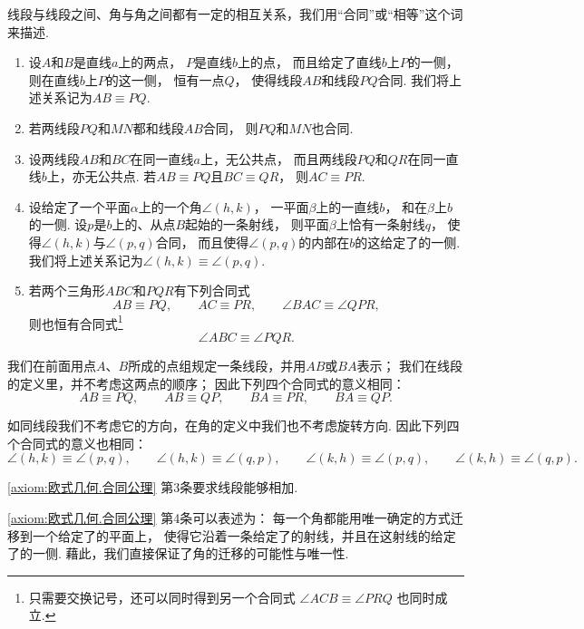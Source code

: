 \begin{axiom}[合同公理]\label{axiom:欧式几何.合同公理}
线段与线段之间、角与角之间都有一定的相互关系，我们用“合同”或“相等”这个词来描述.
\begin{enumerate}
\item 设\(A\)和\(B\)是直线\(a\)上的两点，%
\(P\)是直线\(b\)上的点，%
而且给定了直线\(b\)上\(P\)的一侧，%
则在直线\(b\)上\(P\)的这一侧，%
恒有一点\(Q\)，%
使得线段\(AB\)和线段\(PQ\)合同.
我们将上述关系记为\(AB \equiv PQ\).

\item 若两线段\(PQ\)和\(MN\)都和线段\(AB\)合同，%
则\(PQ\)和\(MN\)也合同.

\item 设两线段\(AB\)和\(BC\)在同一直线\(a\)上，无公共点，%
而且两线段\(PQ\)和\(QR\)在同一直线\(b\)上，亦无公共点.
若\(AB \equiv PQ\)且\(BC \equiv QR\)，%
则\(AC \equiv PR\).

\item 设给定了一个平面\(\alpha\)上的一个角\(\angle(h,k)\)，%
一平面\(\beta\)上的一直线\(b\)，%
和在\(\beta\)上\(b\)的一侧.
设\(p\)是\(b\)上的、从点\(B\)起始的一条射线，%
则平面\(\beta\)上恰有一条射线\(q\)，%
使得\(\angle(h,k)\)与\(\angle(p,q)\)合同，%
而且使得\(\angle(p,q)\)的内部在\(b\)的这给定了的一侧.
我们将上述关系记为\(\angle(h,k) \equiv \angle(p,q)\).

\item 若两个三角形\(ABC\)和\(PQR\)有下列合同式
\[
AB \equiv PQ, \qquad
AC \equiv PR, \qquad
\angle BAC \equiv \angle QPR,
\]
则也恒有合同式\footnote{%
只需要交换记号，还可以同时得到另一个合同式
\(\angle ACB \equiv \angle PRQ\)
也同时成立.
}
\[
\angle ABC \equiv \angle PQR.
\]
\end{enumerate}
\end{axiom}

我们在前面用点\(A\)、\(B\)所成的点组规定一条线段，并用\(AB\)或\(BA\)表示；
我们在线段的定义里，并不考虑这两点的顺序；
因此下列四个合同式的意义相同：
\[
AB \equiv PQ, \qquad
AB \equiv QP, \qquad
BA \equiv PR, \qquad
BA \equiv QP.
\]

如同线段我们不考虑它的方向，在角的定义中我们也不考虑旋转方向.
因此下列四个合同式的意义也相同：
\[
\angle(h,k) \equiv \angle(p,q), \qquad
\angle(h,k) \equiv \angle(q,p), \qquad
\angle(k,h) \equiv \angle(p,q), \qquad
\angle(k,h) \equiv \angle(q,p).
\]

\cref{axiom:欧式几何.合同公理} 第3条要求线段能够相加.

\cref{axiom:欧式几何.合同公理} 第4条可以表述为：
每一个角都能用唯一确定的方式迁移到一个给定了的平面上，%
使得它沿着一条给定了的射线，并且在这射线的给定了的一侧.
藉此，我们直接保证了角的迁移的可能性与唯一性.

